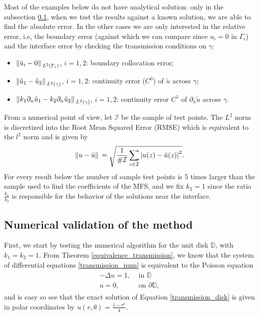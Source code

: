 Most of the examples below do not have analytical solution: only in the subsection \ref{transmission_val_subsection}, when we test the results against a known solution, we are able to find the absolute error. In the other cases we are only interested in the relative error, i.e, the boundary error (against which we can compare since \(u_i=0\) in \(\Gamma_i\)) and the interface error by checking the transmission conditions on \(\gamma\):
\begin{itemize}
    \item \(\norm*{\tilde{u}_i - 0}_{L^2(\Gamma_i)}\), \(i=1, 2\): boundary collocation error;
    \item \(\norm*{\tilde{u}_1 - \tilde{u}_2}_{L^2(\gamma)}\), \(i=1, 2\): continuity error (\(C^0\)) of \(\tilde{u}\) across \(\gamma\);
    \item \(\norm*{k_1 \partial_n\tilde{u}_1 - k_2 \partial_n\tilde{u}_2}_{L^2(\gamma)}\), \(i=1, 2\): continuity error \(C^1\) of \(\partial_n\tilde{u}\) across \(\gamma\).
\end{itemize}
From a numerical point of view, let \(\mathcal{I}\) be the sample of test points. The \(L^2\) norm is discretized into the Root Mean Squared Error (\ac{RMSE}) which is equivalent to the \(l^2\) norm and is given by
\[
    \norm*{u-\tilde{u}}= \sqrt{\frac{1}{\#\mathcal{I}} \sum_{z \in \mathcal{I}} \abs{u(z)-\tilde{u}(z)}^2}.
\]
For every result below the number of sample test points is 5 times larger than the sample used to find the coefficients of the MFS, and we fix \(k_2=1\) since the ratio \(\frac{k_1}{k_2}\) is responsible for the behavior of the solutions near the interface. 

\subsection{Numerical validation of the method}\label{transmission_val_subsection}

First, we start by testing the numerical algorithm for the unit disk \(\mathbb{D}\), with \(k_1=k_2=1\). From Theorem \eqref{equivalence_transmission}, we know that the system of differential equations \eqref{transmission_num} is equivalent to the Poisson equation
\begin{align}\label{transmission_disk}
    \begin{split}
        -\Delta u = 1, & \text{ in } \mathbb{D}\\
        u = 0, & \text{ on } \partial\mathbb{D},
    \end{split}
\end{align}
and is easy so see that the exact solution of Equation \eqref{transmission_disk} is given in polar coordinates by \(u(r, \theta) = \frac{1-r^2}{4}\). 

